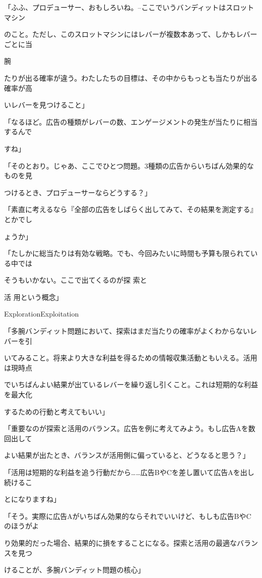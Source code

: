 「ふふ、プロデューサー、おもしろいね。--ここでいうバンディットはスロットマシン\par
のこと。ただし、このスロットマシンにはレバーが複数本あって、しかもレバーごとに当\par
腕\par
たりが出る確率が違う。わたしたちの⽬標は、その中からもっとも当たりが出る確率が⾼\par
いレバーを⾒つけること」\par
「なるほど。広告の種類がレバーの数、エンゲージメントの発⽣が当たりに相当するんで\par
すね」\par
「そのとおり。じゃあ、ここでひとつ問題。3種類の広告からいちばん効果的なものを⾒\par
つけるとき、プロデューサーならどうする？」\par
「素直に考えるなら『全部の広告をしばらく出してみて、その結果を測定する』とかでし\par
ょうか」\par
「たしかに総当たりは有効な戦略。でも、今回みたいに時間も予算も限られている中では\par
そうもいかない。ここで出てくるのが探 索と\par
活 ⽤という概念」\par
ExplorationExploitation\par
「多腕バンディット問題において、探索はまだ当たりの確率がよくわからないレバーを引\par
いてみること。将来より⼤きな利益を得るための情報収集活動ともいえる。活⽤は現時点\par
でいちばんよい結果が出ているレバーを繰り返し引くこと。これは短期的な利益を最⼤化\par
するための⾏動と考えてもいい」\par
「重要なのが探索と活⽤のバランス。広告を例に考えてみよう。もし広告Aを数回出して\par
よい結果が出たとき、バランスが活⽤側に偏っていると、どうなると思う？」\par
「活⽤は短期的な利益を追う⾏動だから……広告BやCを差し置いて広告Aを出し続けるこ\par
とになりますね」\par
「そう。実際に広告Aがいちばん効果的ならそれでいいけど、もしも広告BやCのほうがよ\par
り効果的だった場合、結果的に損をすることになる。探索と活⽤の最適なバランスを⾒つ\par
けることが、多腕バンディット問題の核⼼」\par
